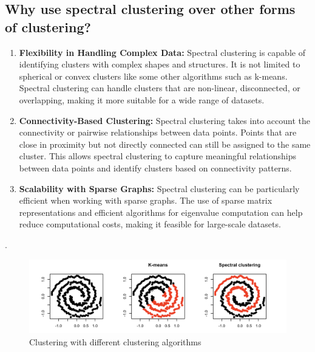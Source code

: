 \documentclass{article}
\begin{document}
    \subsection{Why use spectral clustering over other forms of clustering?}
        \begin{enumerate}
            \item \textbf{Flexibility in Handling Complex Data:} Spectral clustering is capable of identifying clusters with complex shapes and structures. It is not limited to spherical or convex clusters like some other algorithms such as k-means. Spectral clustering can handle clusters that are non-linear, disconnected, or overlapping, making it more suitable for a wide range of datasets.
            \item \textbf{Connectivity-Based Clustering:} Spectral clustering takes into account the connectivity or pairwise relationships between data points. Points that are close in proximity but not directly connected can still be assigned to the same cluster. This allows spectral clustering to capture meaningful relationships between data points and identify clusters based on connectivity patterns.
            \item \textbf{Scalability with Sparse Graphs:} Spectral clustering can be particularly efficient when working with sparse graphs. The use of sparse matrix representations and efficient algorithms for eigenvalue computation can help reduce computational costs, making it feasible for large-scale datasets.
        \end{enumerate}.
        \begin{figure}[H]
            \centering
            \includegraphics[scale=0.26]{ProsSpectralClust.png}
            \caption{Clustering with different clustering algorithms}
            \label{fig:clustering}
        \end{figure}
\end{document}
